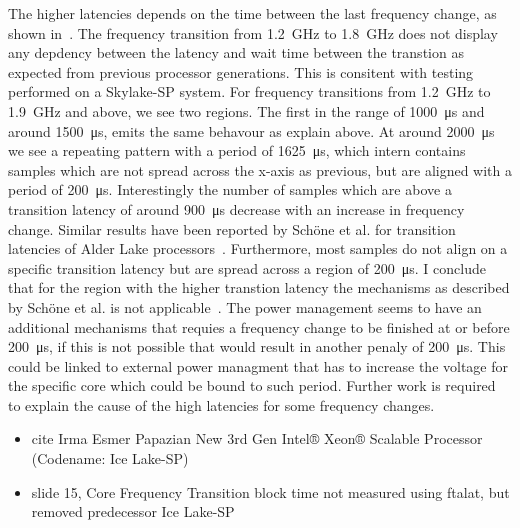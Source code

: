 The higher latencies depends on the time between the last frequency change, as shown in~.
The frequency transition from \SI{1.2}{\GHz} to \SI{1.8}{\GHz} does not display any depdency between the latency and wait time between the transtion as expected from previous processor generations.
This is consitent with testing performed on a Skylake-SP system.
For frequency transitions from \SI{1.2}{\GHz} to \SI{1.9}{\GHz} and above, we see two regions.
The first in the range of \SI{1000}{\us} and around \SI{1500}{\us}, emits the same behavour as explain above.
At around \SI{2000}{\us} we see a repeating pattern with a period of \SI{1625}{\us}, which intern contains samples which are not spread across the x-axis as previous, but are aligned with a period of \SI{200}{\us}.
Interestingly the number of samples which are above a transition latency of around \SI{900}{\us} decrease with an increase in frequency change.
Similar results have been reported by Schöne et al. for transition latencies of Alder Lake processors~\cite{Schoene_2024_Alder_Lake}.
Furthermore, most samples do not align on a specific transition latency but are spread across a region of \SI{200}{\us}.
I conclude that for the region with the higher transtion latency the mechanisms as described by Schöne et al. is not applicable~\cite{skylake_paper}.
The power management seems to have an additional mechanisms that requies a frequency change to be finished at or before \SI{200}{\us}, if this is not possible that would result in another penaly of \SI{200}{\us}.
This could be linked to external power managment that has to increase the voltage for the specific core which could be bound to such period.
Further work is required to explain the cause of the high latencies for some frequency changes.

\begin{itemize}
    \item cite Irma Esmer Papazian New 3rd Gen Intel® Xeon® Scalable Processor (Codename: Ice Lake-SP)
    \item slide 15, Core Frequency Transition block time not measured using ftalat, but removed predecessor Ice Lake-SP
\end{itemize}


